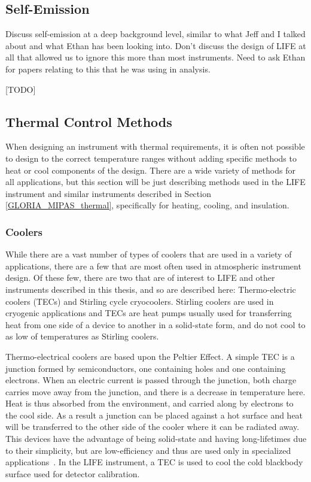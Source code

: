\subsection{Self-Emission}\label{self-emission}
Discuss self-emission at a deep background level, similar to what Jeff and I talked about and what Ethan has been looking into. Don't discuss the design of LIFE at all that allowed us to ignore this more than most instruments. Need to ask Ethan for papers relating to this that he was using in analysis.

[TODO]

\subsection{Thermal Control Methods} \label{Thermal_methods} %
When designing an instrument with thermal requirements, it is often not possible to design to the correct temperature ranges without adding specific methods to heat or cool components of the design. There are a wide variety of methods for all applications, but this section will be just describing methods used in the LIFE instrument and similar instruments described in Section \ref{GLORIA_MIPAS_thermal}, specifically for heating, cooling, and insulation.

\subsubsection{Coolers}

While there are a vast number of types of coolers that are used in a variety of applications, there are a few that are most often used in atmospheric instrument design. Of these few, there are two that are of interest to LIFE and other instruments described in this thesis, and so are described here: Thermo-electric coolers (TECs) and Stirling cycle cryocoolers. Stirling coolers are used in cryogenic applications and TECs are heat pumps usually used for transferring heat from one side of a device to another in a solid-state form, and do not cool to as low of temperatures as Stirling coolers.

Thermo-electrical coolers are based upon the Peltier Effect. A simple TEC is a junction formed by semiconductors, one containing holes and one containing electrons. When an electric current is passed through the junction, both charge carries move away from the junction, and there is a decrease in temperature here. Heat is thus absorbed from the environment, and carried along by electrons to the cool side. As a result a junction can be placed against a hot surface and heat will be transferred to the other side of the cooler where it can be radiated away. This devices have the advantage of being solid-state and having long-lifetimes due to their simplicity, but are low-efficiency and thus are used only in specialized applications~\citep{TE_coolers}. In the LIFE instrument, a TEC is used to cool the cold blackbody surface used for detector calibration.

